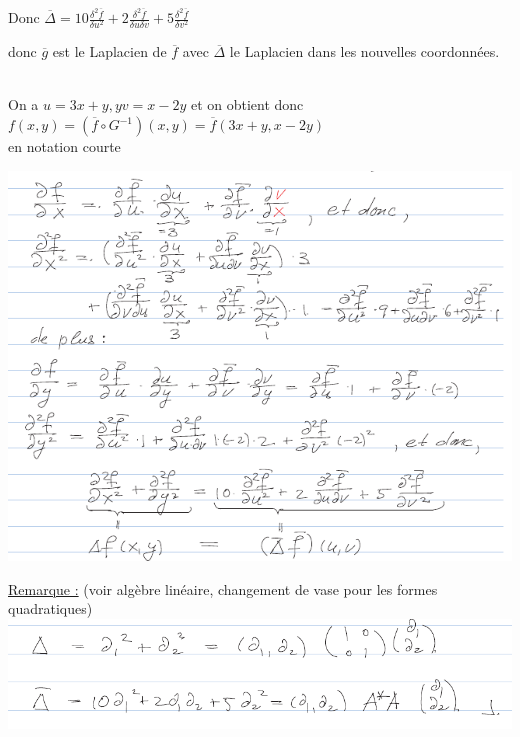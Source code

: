 \documentclass[12pt,a4paper]{article}
\begin{document}
Donc $\overline{\Delta} = 10 \frac{\delta^2 \overline{f}}{\delta u^2} + 2 \frac{\delta^2 \overline{f}}{\delta u \delta v} + 5\frac{\delta^2 \overline{f}}{\delta v^2}$

donc $\overline{g}$ est le Laplacien de $\overline{f}$ avec $\overline{\Delta}$ le Laplacien dans les nouvelles coordonnées.

\\
On a $u = 3x + y,y v = x-2y$ et on obtient donc \\
$f(x,y) = (\overline{f} \circ G^{-1})(x,y) = \overline{f}(3x + y, x-2y)$ \\
en notation courte
\begin{center}
	\includegraphics[scale=0.8]{images/sheit}
\end{center}
\uline{Remarque :} (voir algèbre linéaire, changement de vase pour les formes quadratiques)
\includegraphics[scale=0.5]{images/delta}
\end{document}
